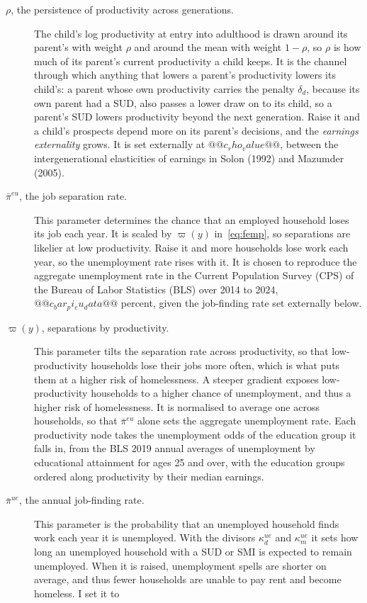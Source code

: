 \documentclass[10pt]{article}
\begin{document}
\begin{description}
\item[$\rho$, the persistence of productivity across generations.] The
child's log productivity at entry into adulthood is drawn around its parent's with weight $\rho$ and
around the mean with weight $1-\rho$, so $\rho$ is how much of its parent's current productivity a
child keeps. It is the channel through which anything that lowers a parent's productivity lowers its child's: a parent whose own productivity carries the penalty $\delta_d$, because its own parent had a SUD, also passes a lower draw on to its child, so a
parent's SUD lowers productivity beyond the next generation. Raise it and a child's prospects depend more
on its parent's decisions, and the \emph{earnings externality} grows. It is set
externally at $@@c_rho_value@@$, between the intergenerational elasticities of earnings
in Solon (1992) and Mazumder (2005).
\item[$\bar\pi^{eu}$, the job separation rate.] This parameter determines the chance that an employed household
loses its job each year. It is scaled by $\varpi(y)$ in~\eqref{eq:femp}, so separations are likelier at low
productivity. Raise it and more households lose work each year, so the unemployment
rate rises with it. It is chosen to reproduce the aggregate
unemployment rate in the Current Population Survey (CPS) of the Bureau of Labor Statistics (BLS) over 2014 to 2024,
$@@c_bar_pi_eu_data@@$ percent, given the job-finding rate set externally below.
\item[$\varpi(y)$, separations by productivity.] This parameter tilts the separation rate across
productivity, so that low-productivity households lose their jobs more often, which is what
puts them at a higher risk of homelessness.   A steeper gradient exposes low-productivity households to a higher chance of unemployment, and thus a higher risk of homelessness. It is normalised to average one across households, so
that $\bar\pi^{eu}$ alone sets the aggregate unemployment rate. Each productivity node takes the
unemployment odds of the education group it falls in, from the BLS 2019 annual averages of
unemployment by educational attainment for ages 25 and over, with the education groups ordered along productivity by their median earnings.
\item[$\bar\pi^{ue}$, the annual job-finding rate.] This parameter is the probability that an
unemployed household finds work each year it is unemployed. With the divisors $\kappa^{ue}_{d}$ and $\kappa^{ue}_{m}$ it sets how long an unemployed household with a SUD or SMI is expected to remain unemployed.  When it is raised, unemployment spells are shorter on average, and thus fewer households are unable to pay rent and become homeless. I set it to

\end{description}
\end{document}
